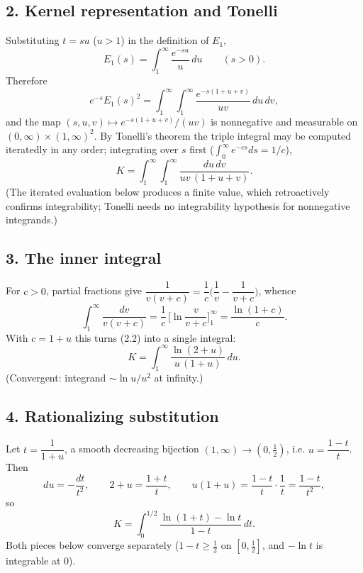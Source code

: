 \documentclass[11pt]{article}
\theoremstyle{remark}
\begin{document}
\subsection*{2. Kernel representation and Tonelli}

Substituting $t=su$ ($u>1$) in the definition of $E_1$,
\begin{equation}E_1(s)=\int_{1}^{\infty}\frac{e^{-su}}{u}\,du\qquad(s>0).
\tag{2.1}\end{equation}
Therefore
$$e^{-s}E_1(s)^{2}=\int_{1}^{\infty}\!\!\int_{1}^{\infty}\frac{e^{-s(1+u+v)}}{uv}\,du\,dv,$$
and the map $(s,u,v)\mapsto e^{-s(1+u+v)}/(uv)$ is nonnegative and measurable on $(0,\infty)\times(1,\infty)^{2}$. By Tonelli's theorem the triple integral may be computed iteratedly in any order; integrating over $s$ first ($\int_0^\infty e^{-cs}ds=1/c$),
\begin{equation}K=\int_{1}^{\infty}\!\!\int_{1}^{\infty}\frac{du\,dv}{uv\,(1+u+v)} .
\tag{2.2}\end{equation}
(The iterated evaluation below produces a finite value, which retroactively confirms integrability; Tonelli needs no integrability hypothesis for nonnegative integrands.)

\subsection*{3. The inner integral}

For $c>0$, partial fractions give $\dfrac{1}{v(v+c)}=\dfrac1c\Big(\dfrac1v-\dfrac1{v+c}\Big)$, whence
$$\int_{1}^{\infty}\frac{dv}{v(v+c)}=\frac1c\,\Big[\ln\frac{v}{v+c}\Big]_{1}^{\infty}=\frac{\ln(1+c)}{c}.$$
With $c=1+u$ this turns (2.2) into a single integral:
\begin{equation}K=\int_{1}^{\infty}\frac{\ln(2+u)}{u\,(1+u)}\,du .
\tag{3.1}\end{equation}
(Convergent: integrand $\sim\ln u/u^{2}$ at infinity.)

\subsection*{4. Rationalizing substitution}

Let $t=\dfrac{1}{1+u}$, a smooth decreasing bijection $(1,\infty)\to(0,\tfrac12)$, i.e. $u=\dfrac{1-t}{t}$. Then
$$du=-\frac{dt}{t^{2}},\qquad 2+u=\frac{1+t}{t},\qquad u(1+u)=\frac{1-t}{t}\cdot\frac1t=\frac{1-t}{t^{2}},$$
so
\begin{equation}K=\int_{0}^{1/2}\frac{\ln(1+t)-\ln t}{1-t}\,dt .
\tag{4.1}\end{equation}
Both pieces below converge separately ($1-t\ge\tfrac12$ on $[0,\tfrac12]$, and $-\ln t$ is integrable at $0$).
\end{document}
